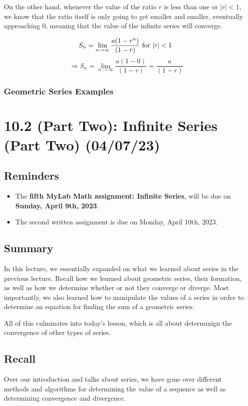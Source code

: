 \documentclass{report}
\begin{document}
\begin{sloppypar}
      On the other hand, whenever the value of the ratio $ r $ is less than one or $ | r| < 1 $, we know
      that the ratio itself is only going to get smaller and smaller, eventually approaching 0, meaning
      that the value of the infinite series will converge.

      \[ S_{n} = \lim_{n \rightarrow \infty} \frac{a(1-r^{n})}{(1-r)} \textrm{ for $ |r| < 1$  }\]
      \[ \Rightarrow S_{n} = \lim_{n \rightarrow \infty} \frac{a(1-0)}{(1-r)} = \frac{a}{(1-r)}\]



\subsection{Geometric Series Examples}
\chapter{10.2 (Part Two): Infinite Series (Part Two) (04/07/23)}
\section{Reminders}
\begin{itemize}
  \item The \textbf{fifth MyLab Math assignment: Infinite Series}, will be due on
        \textbf{Sunday, April 9th, 2023}.

  \item The second written assignment is due on {Monday, April 10th, 2023}.
\end{itemize}
\section{Summary}
In this lecture, we essentially expanded on what we learned about series in the previous
lecture.
Recall how we learned about geometric series, their formation, as well as how we
determine whether or not they converge or diverge. Most importantly, we also
learned how to manipulate the values of a series in order to determine
an equation for finding the sum of a geometric series.
\par All of this culminates into today's lesson, which is all about
determinign the convergence of other types of series.
\section{Recall}
Over our introduction and talks about series, we have gone over
different methods and algorithms for determining the value of a
sequence as well as determining convergence and divergence.

\end{sloppypar}
\end{document}
